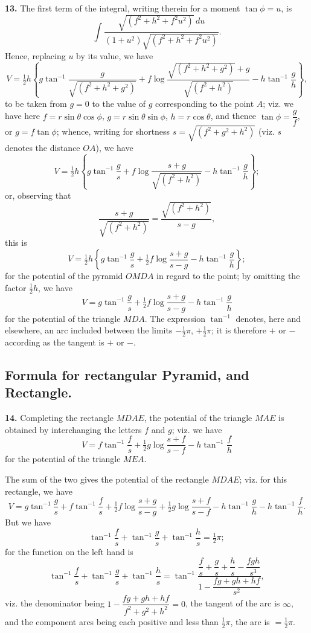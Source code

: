 \documentclass[11pt,a4paper]{book}
\begin{document}
\newpage
\noindent\textbf{13.}\quad
The first term of the integral, writing therein for a moment $\tan\phi=u$,
is
\[
\int \frac{\sqrt{(f^2+h^2+f^2u^2)}\,du}{(1+u^2)\sqrt{(f^2+h^2+f^2u^2)}}.
\]
Hence, replacing $u$ by its value, we have
\[
V = \tfrac{1}{2}h
    \left\{
      g\tan^{-1}\frac{g}{\sqrt{(f^2+h^2+g^2)}}
      + f\log\frac{\sqrt{(f^2+h^2+g^2)}+g}{\sqrt{(f^2+h^2)}}
      - h\tan^{-1}\frac{g}{h}
    \right\},
\]
to be taken from $g=0$ to the value of $g$ corresponding to the point $A$;
viz. we have here $f=r\sin\theta\cos\phi$, $g=r\sin\theta\sin\phi$,
$h=r\cos\theta$, and thence $\tan\phi=\dfrac{g}{f}$, or $g=f\tan\phi$;
whence, writing for shortness $s=\sqrt{(f^2+g^2+h^2)}$ (viz. $s$ denotes the
distance $OA$), we have
\[
V = \tfrac{1}{2}h
    \left\{
      g\tan^{-1}\frac{g}{s} + f\log\frac{s+g}{\sqrt{(f^2+h^2)}}
      - h\tan^{-1}\frac{g}{h}
    \right\};
\]
or, observing that
\[
\frac{s+g}{\sqrt{(f^2+h^2)}} = \frac{\sqrt{(f^2+h^2)}}{s-g},
\]
this is
\[
V = \tfrac{1}{2}h
    \left\{
      g\tan^{-1}\frac{g}{s} + \tfrac{1}{2}f\log\frac{s+g}{s-g}
      - h\tan^{-1}\frac{g}{h}
    \right\};
\]
for the potential of the pyramid $OMDA$ in regard to the point; by omitting
the factor $\tfrac{1}{2}h$, we have
\[
V = g\tan^{-1}\frac{g}{s} + \tfrac{1}{2}f\log\frac{s+g}{s-g}
  - h\tan^{-1}\frac{g}{h}
\]
for the potential of the triangle $MDA$. The expression $\tan^{-1}$ denotes,
here and elsewhere, an arc included between the limits $-\tfrac{1}{2}\pi$,
$+\tfrac{1}{2}\pi$; it is therefore $+$ or $-$ according as the tangent is
$+$ or $-$.

\newpage
\subsection*{Formula for rectangular Pyramid, and Rectangle.}

\smallskip\noindent\textbf{14.}\quad
Completing the rectangle $MDAE$, the potential of the triangle $MAE$ is
obtained by interchanging the letters $f$ and $g$; viz. we have
\[
V = f\tan^{-1}\frac{f}{s} + \tfrac{1}{2}g\log\frac{s+f}{s-f}
  - h\tan^{-1}\frac{f}{h}
\]
for the potential of the triangle $MEA$.

The sum of the two gives the potential of the rectangle $MDAE$; viz. for
this rectangle, we have
\[
V = g\tan^{-1}\frac{g}{s} + f\tan^{-1}\frac{f}{s}
  + \tfrac{1}{2}f\log\frac{s+g}{s-g} + \tfrac{1}{2}g\log\frac{s+f}{s-f}
  - h\tan^{-1}\frac{g}{h} - h\tan^{-1}\frac{f}{h}.
\]
But we have
\[
\tan^{-1}\frac{f}{s} + \tan^{-1}\frac{g}{s} + \tan^{-1}\frac{h}{s}
= \tfrac{1}{2}\pi;
\]
for the function on the left hand is
\[
\tan^{-1}\frac{f}{s} + \tan^{-1}\frac{g}{s} + \tan^{-1}\frac{h}{s}
= \tan^{-1}
  \frac{\dfrac{f}{s}+\dfrac{g}{s}+\dfrac{h}{s}
        -\dfrac{fgh}{s^3}}
       {1-\dfrac{fg+gh+hf}{s^2}},
\]
viz. the denominator being $1-\dfrac{fg+gh+hf}{f^2+g^2+h^2}=0$, the tangent of
the arc is $\infty$, and the component arcs being each positive and less than
$\tfrac{1}{2}\pi$, the arc is $=\tfrac{1}{2}\pi$.
\end{document}
